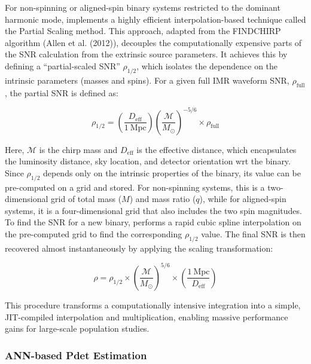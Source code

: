 \documentclass[10pt,a4paper,onecolumn]{article}
\let\textttOrig=\texttt
\def\texttt#1{\expandafter\textttOrig{\seqsplit{#1}}}
\begin{document}
For non-spinning or aligned-spin binary systems restricted to the
dominant harmonic mode, \texttt{gwsnr} implements a highly efficient
interpolation-based technique called the Partial Scaling method. This
approach, adapted from the FINDCHIRP algorithm (Allen et al. (2012)),
decouples the computationally expensive parts of the SNR calculation
from the extrinsic source parameters. It achieves this by defining a
``partial-scaled SNR'' \(\rho_{1/2}\), which isolates the dependence on
the intrinsic parameters (masses and spins). For a given full IMR
waveform SNR, \(\rho_{\text{full}}\), the partial SNR is defined as:

\[
\rho_{1/2} = \left(\frac{D_\mathrm{eff}}{1~\mathrm{Mpc}}\right) \left(\frac{\mathcal{M}}{M_\odot}\right)^{-5/6} \times \rho_{\text{full}}
\]

Here, \(\mathcal{M}\) is the chirp mass and \(D_{\text{eff}}\) is the
effective distance, which encapsulates the luminosity distance, sky
location, and detector orientation wrt the binary. Since \(\rho_{1/2}\)
depends only on the intrinsic properties of the binary, its value can be
pre-computed on a grid and stored. For non-spinning systems, this is a
two-dimensional grid of total mass (\(M\)) and mass ratio (\(q\)), while
for aligned-spin systems, it is a four-dimensional grid that also
includes the two spin magnitudes. To find the SNR for a new binary,
\texttt{gwsnr} performs a rapid cubic spline interpolation on the
pre-computed grid to find the corresponding \(\rho_{1/2}\) value. The
final SNR is then recovered almost instantaneously by applying the
scaling transformation:

\[
\rho = \rho_{1/2} \times \left(\frac{\mathcal{M}}{M_\odot}\right)^{5/6} \times \left(\frac{1~\mathrm{Mpc}}{D_\mathrm{eff}}\right)
\]

This procedure transforms a computationally intensive integration into a
simple, JIT-compiled interpolation and multiplication, enabling massive
performance gains for large-scale population studies.

\subsubsection{ANN-based Pdet
Estimation}\label{ann-based-pdet-estimation}
\end{document}

